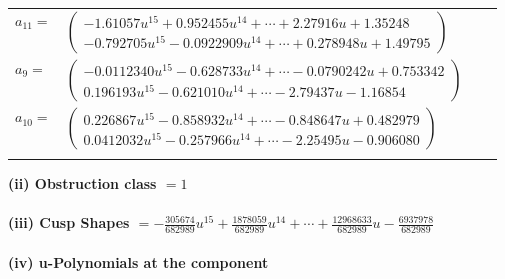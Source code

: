 \documentclass[1p]{elsarticle_modified}
\theoremstyle{definition}
\begin{document}
\begin{tabular}{m{7pt} m{180pt} m{7pt} m{180pt} }
\flushright $a_{11}=$&$\begin{pmatrix}-1.61057 u^{15}+0.952455 u^{14}+\cdots+2.27916 u+1.35248\\-0.792705 u^{15}-0.0922909 u^{14}+\cdots+0.278948 u+1.49795\end{pmatrix}$ \\
\flushright $a_{9}=$&$\begin{pmatrix}-0.0112340 u^{15}-0.628733 u^{14}+\cdots-0.0790242 u+0.753342\\0.196193 u^{15}-0.621010 u^{14}+\cdots-2.79437 u-1.16854\end{pmatrix}$ \\
\flushright $a_{10}=$&$\begin{pmatrix}0.226867 u^{15}-0.858932 u^{14}+\cdots-0.848647 u+0.482979\\0.0412032 u^{15}-0.257966 u^{14}+\cdots-2.25495 u-0.906080\end{pmatrix}$\\&\end{tabular}
\flushleft \textbf{(ii) Obstruction class $= 1$}\\~\\
\flushleft \textbf{(iii) Cusp Shapes $= -\frac{305674}{682989} u^{15}+\frac{1878059}{682989} u^{14}+\cdots+\frac{12968633}{682989} u-\frac{6937978}{682989}$}\\~\\
\newpage\renewcommand{\arraystretch}{1}
\flushleft \textbf{(iv) u-Polynomials at the component}\newline \\
\end{document}
